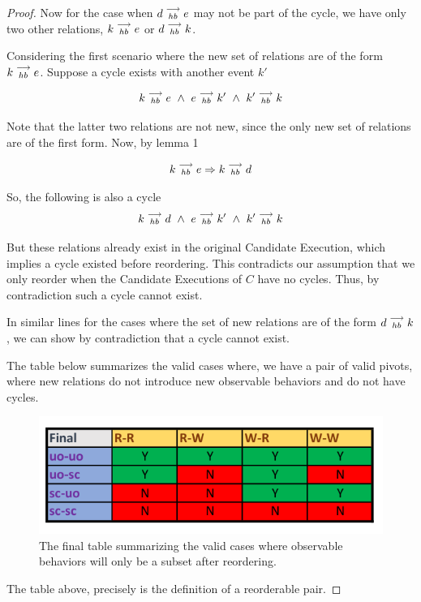 \begin{proof}
        Now for the case when $d\stackrel{\longrightarrow}{_{hb}}e$ may not be part of the cycle, we have only two other relations, $k\stackrel{\longrightarrow}{_{hb}}e$ or $d\stackrel{\longrightarrow}{_{hb}}k$.
        
        Considering the first scenario where the new set of relations are of the form $k\stackrel{\longrightarrow}{_{hb}}e$. Suppose a cycle exists with another event $k'$
        
        \[
            k\stackrel{\longrightarrow}{_{hb}}e \ \wedge \
            e\stackrel{\longrightarrow}{_{hb}}k' \ \wedge \
            k'\stackrel{\longrightarrow}{_{hb}}k
        \]
        
        Note that the latter two relations are not new, since the only new set of relations are of the first form. Now, by lemma 1
        
        \[
            k\stackrel{\longrightarrow}{_{hb}}e \Rightarrow k\stackrel{\longrightarrow}{_{hb}}d
        \]
        
        So, the following is also a cycle
        \[
            k\stackrel{\longrightarrow}{_{hb}}d \ \wedge \
            e\stackrel{\longrightarrow}{_{hb}}k' \ \wedge \
            k'\stackrel{\longrightarrow}{_{hb}}k
        \]
        
        But these relations already exist in the original Candidate Execution, which implies a cycle existed before reordering. This contradicts our assumption that we only reorder when the Candidate Executions of $C$ have no cycles. Thus, by contradiction such a cycle cannot exist.
        
        In similar lines for the cases where the set of new relations are of the form $d\stackrel{\longrightarrow}{_{hb}}k$, we can show by contradiction that a cycle cannot exist. 
        
        The table below summarizes the valid cases where, we have a pair of valid pivots, where new relations do not introduce new observable behaviors and do not have cycles. 
        \begin{figure}[H]
            \centering
            \includegraphics[scale=0.7]{Table4_Final.pdf}
            \caption{The final table summarizing the valid cases where observable behaviors will only be a subset after reordering.}
            \label{fig:my_label}
        \end{figure}
    
        The table above, precisely is the definition of a reorderable pair. 
        
        
\end{proof}

